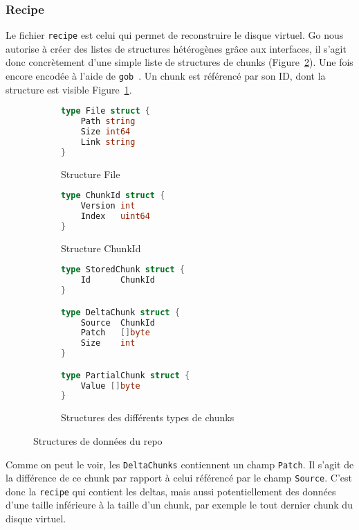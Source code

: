 \documentclass[a4paper]{report}
\begin{document}
\subsubsection{Recipe}
Le fichier \verb|recipe| est celui qui permet de reconstruire le disque virtuel.
Go nous autorise à créer des listes de structures hétérogènes grâce aux interfaces,
il s'agit donc concrètement d'une simple liste de structures de chunks (Figure~\ref{fig:type-chunks-struct}).
Une fois encore encodée à l'aide de \verb|gob|~\cite{pike2011gob}.
Un chunk est référencé par son ID, dont la structure est visible Figure~\ref{fig:type-chunkid-struct}.

\begin{figure}[ht]
\centering
\begin{subfigure}[t]{.45\textwidth}
\begin{lstlisting}[language=Go]
type File struct {
    Path string
    Size int64
    Link string
}
\end{lstlisting}
\caption{Structure File}
\label{fig:type-file-struct}
\hfill
\begin{lstlisting}[language=Go]
type ChunkId struct {
    Version int
    Index   uint64
}
\end{lstlisting}
\caption{Structure ChunkId}
\label{fig:type-chunkid-struct}
\end{subfigure}
\hfil
\begin{subfigure}[t]{.45\textwidth}
\begin{lstlisting}[language=Go]
type StoredChunk struct {
    Id      ChunkId
}

type DeltaChunk struct {
    Source  ChunkId
    Patch   []byte
    Size    int
}

type PartialChunk struct {
    Value []byte
}
\end{lstlisting}
\caption{Structures des différents types de chunks\protect\footnotemark}
\label{fig:type-chunks-struct}
\end{subfigure}
\caption{Structures de données du repo}
\label{fig:repo-type-struct}
\end{figure}

Comme on peut le voir, les \verb|DeltaChunks| contiennent un champ \verb|Patch|.
Il s'agit de la différence de ce chunk par rapport à celui référencé par le champ \verb|Source|.
C'est donc la \verb|recipe| qui contient les deltas,
mais aussi potentiellement des données d'une taille inférieure à la taille d'un chunk,
par exemple le tout dernier chunk du disque virtuel.
\end{document}
